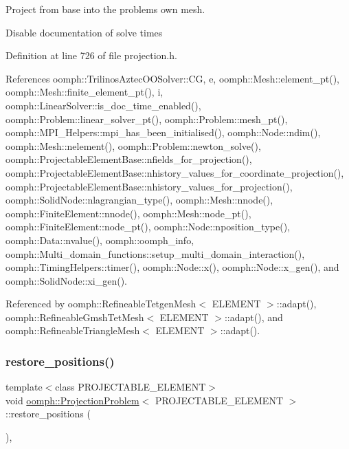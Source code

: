 Project from base into the problem\textquotesingle{}s own mesh. 

Disable documentation of solve times 

Definition at line 726 of file projection.\+h.



References oomph\+::\+Trilinos\+Aztec\+O\+O\+Solver\+::\+CG, e, oomph\+::\+Mesh\+::element\+\_\+pt(), oomph\+::\+Mesh\+::finite\+\_\+element\+\_\+pt(), i, oomph\+::\+Linear\+Solver\+::is\+\_\+doc\+\_\+time\+\_\+enabled(), oomph\+::\+Problem\+::linear\+\_\+solver\+\_\+pt(), oomph\+::\+Problem\+::mesh\+\_\+pt(), oomph\+::\+M\+P\+I\+\_\+\+Helpers\+::mpi\+\_\+has\+\_\+been\+\_\+initialised(), oomph\+::\+Node\+::ndim(), oomph\+::\+Mesh\+::nelement(), oomph\+::\+Problem\+::newton\+\_\+solve(), oomph\+::\+Projectable\+Element\+Base\+::nfields\+\_\+for\+\_\+projection(), oomph\+::\+Projectable\+Element\+Base\+::nhistory\+\_\+values\+\_\+for\+\_\+coordinate\+\_\+projection(), oomph\+::\+Projectable\+Element\+Base\+::nhistory\+\_\+values\+\_\+for\+\_\+projection(), oomph\+::\+Solid\+Node\+::nlagrangian\+\_\+type(), oomph\+::\+Mesh\+::nnode(), oomph\+::\+Finite\+Element\+::nnode(), oomph\+::\+Mesh\+::node\+\_\+pt(), oomph\+::\+Finite\+Element\+::node\+\_\+pt(), oomph\+::\+Node\+::nposition\+\_\+type(), oomph\+::\+Data\+::nvalue(), oomph\+::oomph\+\_\+info, oomph\+::\+Multi\+\_\+domain\+\_\+functions\+::setup\+\_\+multi\+\_\+domain\+\_\+interaction(), oomph\+::\+Timing\+Helpers\+::timer(), oomph\+::\+Node\+::x(), oomph\+::\+Node\+::x\+\_\+gen(), and oomph\+::\+Solid\+Node\+::xi\+\_\+gen().



Referenced by oomph\+::\+Refineable\+Tetgen\+Mesh$<$ E\+L\+E\+M\+E\+N\+T $>$\+::adapt(), oomph\+::\+Refineable\+Gmsh\+Tet\+Mesh$<$ E\+L\+E\+M\+E\+N\+T $>$\+::adapt(), and oomph\+::\+Refineable\+Triangle\+Mesh$<$ E\+L\+E\+M\+E\+N\+T $>$\+::adapt().

\mbox{\label{classoomph_1_1ProjectionProblem_aeb3c03ed8381f389d3d598487b6fb987}} 
\subsubsection{\texorpdfstring{restore\+\_\+positions()}{restore\_positions()}}
{\footnotesize\ttfamily template$<$class P\+R\+O\+J\+E\+C\+T\+A\+B\+L\+E\+\_\+\+E\+L\+E\+M\+E\+NT$>$ \\
void \hyperlink{classoomph_1_1ProjectionProblem}{oomph\+::\+Projection\+Problem}$<$ P\+R\+O\+J\+E\+C\+T\+A\+B\+L\+E\+\_\+\+E\+L\+E\+M\+E\+NT $>$\+::restore\+\_\+positions (\begin{DoxyParamCaption}{ }\end{DoxyParamCaption})\hspace{0.3cm}{\ttfamily [inline]}, {\ttfamily [private]}}



